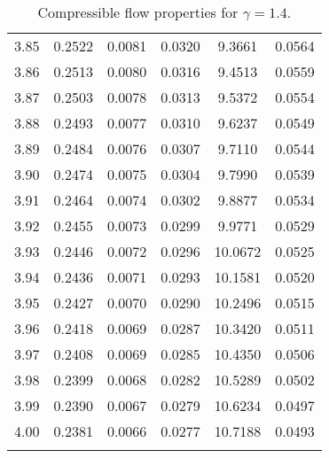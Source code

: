 \documentclass{article}
\begin{document}
\begin{longtable}{cccccc}
3.85 & 0.2522 & 0.0081 & 0.0320 & 9.3661 & 0.0564 \\
3.86 & 0.2513 & 0.0080 & 0.0316 & 9.4513 & 0.0559 \\
3.87 & 0.2503 & 0.0078 & 0.0313 & 9.5372 & 0.0554 \\
3.88 & 0.2493 & 0.0077 & 0.0310 & 9.6237 & 0.0549 \\
3.89 & 0.2484 & 0.0076 & 0.0307 & 9.7110 & 0.0544 \\
3.90 & 0.2474 & 0.0075 & 0.0304 & 9.7990 & 0.0539 \\
3.91 & 0.2464 & 0.0074 & 0.0302 & 9.8877 & 0.0534 \\
3.92 & 0.2455 & 0.0073 & 0.0299 & 9.9771 & 0.0529 \\
3.93 & 0.2446 & 0.0072 & 0.0296 & 10.0672 & 0.0525 \\
3.94 & 0.2436 & 0.0071 & 0.0293 & 10.1581 & 0.0520 \\
3.95 & 0.2427 & 0.0070 & 0.0290 & 10.2496 & 0.0515 \\
3.96 & 0.2418 & 0.0069 & 0.0287 & 10.3420 & 0.0511 \\
3.97 & 0.2408 & 0.0069 & 0.0285 & 10.4350 & 0.0506 \\
3.98 & 0.2399 & 0.0068 & 0.0282 & 10.5289 & 0.0502 \\
3.99 & 0.2390 & 0.0067 & 0.0279 & 10.6234 & 0.0497 \\
4.00 & 0.2381 & 0.0066 & 0.0277 & 10.7188 & 0.0493 \\
\bottomrule
\caption{Compressible flow properties for $\gamma = 1.4$.}
\end{longtable}
\end{document}
